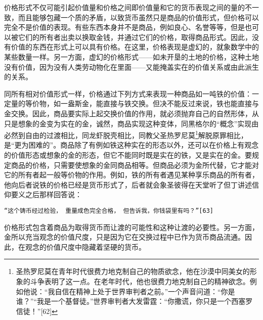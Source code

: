\documentclass{ctexbook}
\begin{document}
    价格形式不仅可能引起价值量和价格之间即价值量和它的货币表现之间的量的不一致，而且能够包藏一个质的矛盾，以致货币虽然只是商品的价值形式，但价格可以完全不是价值的表现。有些东西本身并不是商品，例如良心、名誉等等，但是也可以被它们的所有者出卖以换取金钱，并通过它们的价格，取得商品形式。因此，没有价值的东西在形式上可以具有价格。在这里，价格表现是虚幻的，就象数学中的某些数量一样。另一方面，虚幻的价格形式——如未开垦的土地的价格，这种土地没有价值，因为没有人类劳动物化在里面——又能掩盖实在的价值关系或由此派生的关系。

    同所有相对价值形式一样，价格通过下列方式来表现一种商品如一吨铁的价值：一定量的等价物，如一盎斯金，能直接与铁交换。但决不能反过来说，铁也能直接与金交换。因此，商品要实际上起交换价值的作用，就必须抛弃自己的自然形体，从只是想象的金变为实在的金，诚然，商品实现这种变体，同黑格尔的“概念”实现由必然到自由的过渡相比，同龙虾脱壳相比，同教父圣热罗尼莫\footnote{圣热罗尼莫在青年时代很费力地克制自己的物质欲念，他在沙漠中同美女的形象的斗争表明了这一点。在老年时代，他也很费力地克制自己的精神欲念。例如他说：“我自信在精神上处于世界审判者之前。”一个声音问道：“你是谁？”“我是一个基督徒。”世界审判者大发雷霆：“你撒谎，你只是一个西塞罗信徒！”[62]}解脱原罪相比，是“更为困难的”。商品除了有例如铁这种实在的形态以外，还可以在价格上有观念的价值形态或想象的金的形态，但它不能同时既是实在的铁，又是实在的金。要规定商品的价格，只需要使想象的金同商品相等。但商品必须为金所代替，它才能对它的所有者起一般等价物的作用。例如，铁的所有者遇见某种享乐商品的所有者，他向后者说铁的价格已经是货币形式了，后者就会象圣彼得在天堂听了但丁讲述信仰要义之后那样回答说：

    \begin{center}
        \texttt{“这个铸币经过检验，\\重量成色完全合格，\\但告诉我，你钱袋里有吗？”[63]}
    \end{center}
    
    价格形式包含着商品为取得货币而让渡的可能性和这种让渡的必要性。另一方面，金所以充当观念的价值尺度，只是因为它在交换过程中已作为货币商品流通。因此，在观念的价值尺度中隐藏着坚硬的货币。




        
\end{document}
